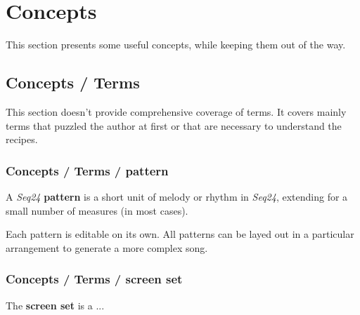 %
%
%

\section{Concepts}
\label{sec:concepts}

   This section presents some useful concepts, while keeping them out of the
   way.

\subsection{Concepts / Terms}
\label{subsec:concepts_terms}

   This section doesn't provide comprehensive coverage of terms.  It
   covers mainly terms that puzzled the author at first or that are
   necessary to understand the recipes.

\subsubsection{Concepts / Terms / pattern}
\label{subsubsec:concepts_terms_pattern}

   A \textsl{Seq24} \textbf{pattern}
   is a short unit of melody or rhythm in \textsl{Seq24},
   extending for a small number of measures (in most cases).

   Each pattern is editable on its own.  All patterns can be layed out in
   a particular arrangement to generate a more complex song.

\subsubsection{Concepts / Terms / screen set}
\label{subsubsec:concepts_terms_screen_set}

   The \textbf{screen set}
   is a ...

